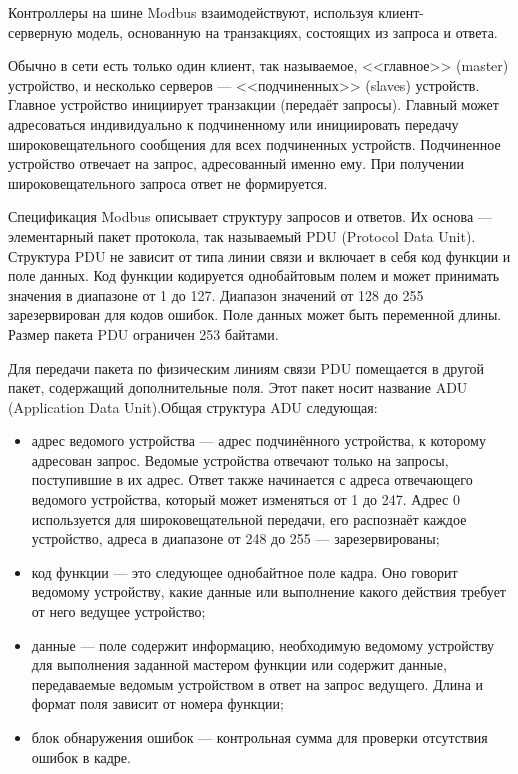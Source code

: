         Контроллеры на шине Modbus взаимодействуют, используя клиент-\\серверную
        модель, основанную на транзакциях, состоящих из запроса и ответа.

        Обычно в сети есть только один клиент, так называемое, <<главное>> 
        (master) устройство, и несколько серверов — <<подчиненных>> (slaves)
        устройств. Главное устройство инициирует транзакции (передаёт запросы).
        Главный может адресоваться индивидуально к подчиненному или
        инициировать передачу широковещательного сообщения для всех подчиненных
        устройств. Подчиненное устройство отвечает на запрос, адресованный
        именно ему. При получении широковещательного запроса ответ не
        формируется.

        Спецификация Modbus описывает структуру запросов и ответов. Их основа —
        элементарный пакет протокола, так называемый PDU (Protocol Data Unit).
        Структура PDU не зависит от типа линии связи и включает в себя код
        функции и поле данных. Код функции кодируется однобайтовым полем и
        может принимать значения в диапазоне от 1 до 127. Диапазон значений от
        128 до 255 зарезервирован для кодов ошибок. Поле данных может быть
        переменной длины. Размер пакета PDU ограничен 253 байтами.

        Для передачи пакета по физическим линиям связи PDU помещается в другой
        пакет, содержащий дополнительные поля. Этот пакет носит название ADU
        (Application Data Unit).Общая структура ADU следующая:
        
        \begin{itemize}
            \item адрес ведомого устройства — адрес подчинённого устройства, к
                которому адресован запрос. Ведомые устройства отвечают только
                на запросы, поступившие в их адрес. Ответ также начинается с
                адреса отвечающего ведомого устройства, который может
                изменяться от 1 до 247. Адрес 0 используется для
                широковещательной передачи, его распознаёт каждое устройство,
                адреса в диапазоне от 248 до 255 — зарезервированы; 
            \item код функции — это следующее однобайтное поле кадра. Оно
                говорит ведомому устройству, какие данные или выполнение какого
                действия требует от него ведущее устройство; 
            \item данные — поле содержит информацию, необходимую ведомому
                устройству для выполнения заданной мастером функции или
                содержит данные, передаваемые ведомым устройством в ответ на
                запрос ведущего.  Длина и формат поля зависит от номера
                функции;
            \item блок обнаружения ошибок — контрольная сумма для проверки
                отсутствия ошибок в кадре.
        \end{itemize}

